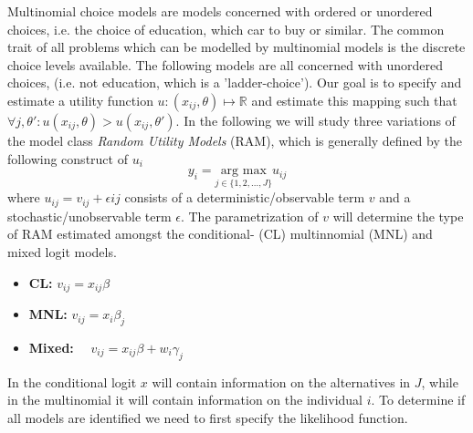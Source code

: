 Multinomial choice models are models concerned with ordered or unordered choices, i.e. the choice of education, which car to buy or similar. The common trait of all problems which can be modelled by multinomial models is the discrete choice levels available. The following models are all concerned with unordered choices, (i.e. not education, which is a 'ladder-choice'). Our goal is to specify and estimate a utility function $u: (x_{ij}, \theta)\mapsto \mathbb{R}$ and estimate this mapping such that $\forall j, \theta' : u(x_{ij}, \theta)>u(x_{ij}, \theta')$. In the following we will study three variations of the model class \textit{Random Utility Models} (RAM), which is generally defined by the following construct of $u_i$
\begin{equation}
y_i = \underset{j \in \{1,2,...,J \} }{\textrm{arg max}} u_{ij}
\end{equation}
where $u_{ij}=v_{ij}+\epsilon{ij}$ consists of a deterministic/observable term $v$ and a stochastic/unobservable term $\epsilon$. The parametrization of $v$ will determine the type of RAM estimated amongst the conditional- (CL) multinnomial (MNL) and mixed logit models.
\begin{itemize}
\item[]\textbf{CL:}   \qquad     $v_{ij} =x_{ij}\beta $
\item[]\textbf{MNL:}    \quad   $v_{ij} = x_{i}\beta_j$
\item[]\textbf{Mixed:}  \  \  $v_{ij} = x_{ij}\beta + w_{i} \gamma_j $
\end{itemize}
In the conditional logit $x$ will contain information on the alternatives in $J$, while in the multinomial it will contain information on the individual $i$. To determine if all models are identified we need to first specify the likelihood function.

